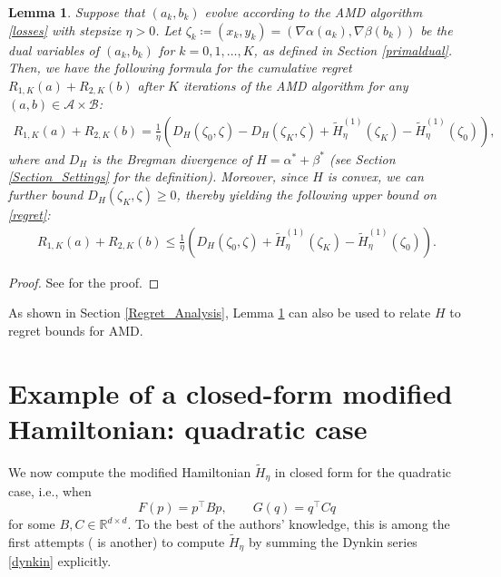 \documentclass[11pt]{article}
\newtheorem{lemma}{Lemma}
\newcommand{\R}{\mathbb{R}}
\newcommand{\A}{\mathcal{A}}
\newcommand{\B}{\mathcal{B}}
\begin{document}
\begin{lemma}\label{Brregman}
Suppose that $\left(a_{k},b_{k}\right)$ evolve according to the AMD algorithm \eqref{losses} with stepsize $\eta>0$. Let $\zeta_{k}\coloneqq \left(x_{k},y_{k}\right)=\left(\nabla\alpha\left(a_{k}\right),\nabla\beta\left(b_{k}\right)\right)$ be the dual variables of $\left(a_{k},b_{k}\right)$ for $k=0,1,\dots,K$, as defined in Section \ref{primaldual}. Then, we have the following formula for the cumulative regret $R_{1,K}(a)+R_{2,K}(b)$ after $K$ iterations of the AMD algorithm for any $(a,b)\in\A\times\B$:
    \begin{gather}
    R_{1,K}(a)+R_{2,K}(b)=\frac{1}{\eta}\left(D_{H}\left(\zeta_{0},\zeta\right)-D_{H}\left(\zeta_{K},\zeta\right)+\widetilde{H}_{\eta}^{(1)}\left(\zeta_{K}\right)-\widetilde{H}_{\eta}^{(1)}\left(\zeta_{0}\right)\right),\label{regret}
\end{gather}
where and $D_{H}$ is the Bregman divergence of $H=\alpha^{*}+\beta^{*}$ (see Section \ref{Section_Settings} for the definition). Moreover, since $H$ is convex, we can further bound $D_{H}\left(\zeta_{K},\zeta\right)\geq 0$, thereby yielding the following upper bound on \eqref{regret}:
\begin{gather}
    R_{1,K}(a)+R_{2,K}(b)\leq\frac{1}{\eta}\left(D_{H}\left(\zeta_{0},\zeta\right)+\widetilde{H}_{\eta}^{(1)}\left(\zeta_{K}\right)-\widetilde{H}_{\eta}^{(1)}\left(\zeta_{0}\right)\right).\label{regretbound}
\end{gather}
\end{lemma}

\begin{proof}
    See \cite[][Appendix B.3.4]{Wibisono2022} for the proof.
\end{proof}
As shown in Section \ref{Regret_Analysis}, Lemma \ref{Brregman} can also be used to relate $H$ to regret bounds for AMD.

\section{Example of a closed-form modified Hamiltonian: quadratic case}\label{Quadratic}
We now compute the modified Hamiltonian $\widetilde{H}_{\eta}$ in closed form for the quadratic case, i.e., when
$$F(p) = p^{\top}Bp, \qquad G(q) = q^{\top}Cq$$
for some $B, C \in \R^{d \times d}$.
To the best of the authors' knowledge, this is among the first attempts (\cite{Field2003} is another) to compute  $\widetilde{H}_{\eta}$ by summing the Dynkin series \eqref{dynkin} explicitly.
\end{document}
